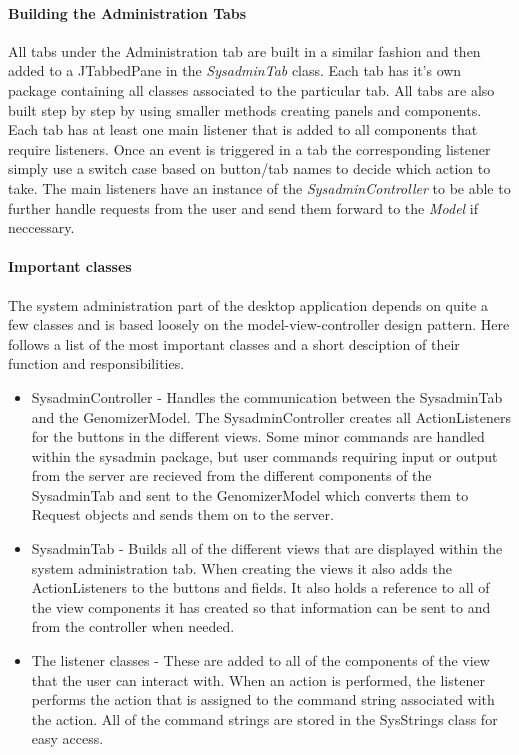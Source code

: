 \paragraph{Building the Administration Tabs}
\label{Building the Administration Tabs}

All tabs under the Administration tab are built in a similar fashion and then added to a
JTabbedPane in the \textit{SysadminTab} class. Each tab has it’s own package containing 
all classes associated to the particular tab. All tabs are also built step by step by 
using smaller methods creating panels and components. Each tab has at least one main 
listener that is added to all components that require listeners. Once an event is triggered 
in a tab the corresponding listener simply use a switch case based on button/tab names 
to decide which action to take. The main listeners have an instance of the \textit{SysadminController }
to be able to further handle requests from the user and send them forward to the \textit{Model} if neccessary.

\paragraph{Important classes}
The system administration part of the desktop application depends on quite a few classes and is based loosely on the model-view-controller design pattern. Here follows a list of the most important classes and a short desciption of their function and responsibilities.
\begin{itemize}
\item SysadminController - Handles the communication between the SysadminTab and the GenomizerModel. The SysadminController creates all ActionListeners for the buttons in the different views. Some minor commands are handled within the sysadmin package, but user commands requiring input or output from the server are recieved from the different components of the SysadminTab and sent to the GenomizerModel which converts them to Request objects and sends them on to the server.
\item SysadminTab - Builds all of the different views that are displayed within the system administration tab. When creating the views it also adds the ActionListeners to the buttons and fields. It also holds a reference to all of the view components it has created so that information can be sent to and from the controller when needed.
\item The listener classes - These are added to all of the components of the view that the user can interact with. When an action is performed, the listener performs the action that is assigned to the command string associated with the action. All of the command strings are stored in the SysStrings class for easy access.
\end{itemize}


